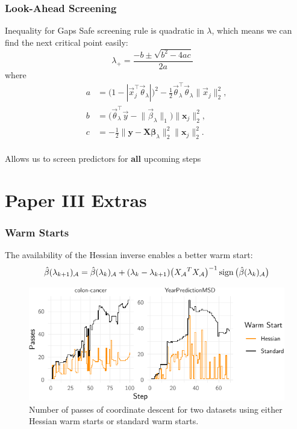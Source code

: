 \documentclass[10pt]{beamer}
\begin{document}
\begin{frame}[c]
  \frametitle{Look-Ahead Screening}
  Inequality for Gaps Safe screening rule is \alert{quadratic} in \(\lambda\), which means we can find the next
  critical point easily:
  \[
    \lambda_+ = \frac{-b \pm \sqrt{b^2 - 4ac}}{2a} \quad
  \]
  where
  \[
    \begin{aligned}
      a & = \big( 1 - | \vec{x}_j^\intercal \vec{\theta}_\lambda|\big)^2 -
      \frac 12 \vec{\theta}_\lambda^\intercal \vec{\theta}_\lambda \lVert \vec{x}_j\rVert_2^2,     \\
      b & = \big(\vec{\theta}_\lambda^\intercal \vec{y} - \lVert \vec{\beta}_\lambda \rVert_1\big)
      \lVert \bm{x}_j \rVert_2^2,                                                                  \\
      c & = - \frac 12 \lVert \bm{y} - \bm{X\beta}_\lambda\rVert_2^2
      \lVert \bm{x}_j\rVert_2^2.                                                                   \\
    \end{aligned}
  \]

  \medskip\pause

  Allows us to screen predictors for \textbf{all} upcoming steps
\end{frame}

\section{Paper III Extras}

\begin{frame}
  \frametitle{Warm Starts}
  The availability of the Hessian inverse enables a better warm start:
  \[
    \hat\beta(\lambda_{k+1})_\mathcal{A} =
    \hat\beta(\lambda_k)_\mathcal{A} +
    (\lambda_k - \lambda_{k+1}) \big({X_\mathcal{A}}^T{X_\mathcal{A}}\big)^{-1}
    \operatorname{sign}\big(\hat\beta(\lambda_k)_\mathcal{A}\big)
  \]

  \pause

  \begin{figure}
    \centering
    \includegraphics{figures/paper3-warm-starts}
    \caption{Number of passes of coordinate descent for two datasets
      using either Hessian warm
      starts or standard warm starts.}
  \end{figure}
\end{frame}
\end{document}
